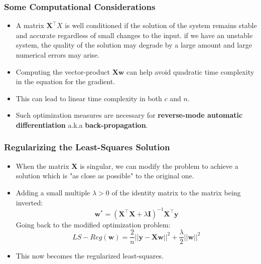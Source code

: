\documentclass{article}
\newcommand{\tbf}[1]{\textbf{#1}}
\newcommand{\mbf}[1]{\mathbf{#1}}
\begin{document}
    \subsubsection{Some Computational Considerations}
    \begin{itemize}
        \item A matrix $\mbf{X}^{\top}X$ is well conditioned if the solution of the system remains stable and accurate regardless of small changes to the
        input. if we have an unstable system, the quality of the solution may degrade by a large amount and large numerical errors may arise.
        \item Computing the vector-product $\mbf{Xw}$ can help avoid quadratic time complexity in the equation for the gradient.
        \item This can lead to linear time complexity in both $c$ and $n$.
        \item Such optimization measures are necessary for \tbf{reverse-mode automatic differentiation} a.k.a \tbf{back-propagation}.
    \end{itemize}
    \subsubsection{Regularizing the Least-Squares Solution}
    \begin{itemize}
        \item When the matrix $\mbf{X}$ is singular, we can modify the problem to achieve a solution which is "as close as possible"
        to the original one.
        \item Adding a small multiple $\lambda > 0$ of the identity matrix to the matrix being inverted:
        \[\mbf{w}^* = (\mbf{X^{\top}X}+\lambda \mbf{I})^{-1} \mbf{X^{\top}y}\]
        Going back to the modified optimization problem:
        \[LS-Reg(\mbf{w})= \frac{2}{n}||\mbf{y-Xw}||^2+\frac{\lambda}{2}||\mbf{w}||^2\]
        \item This now becomes the regularized least-squares.
    \end{itemize}
\end{document}

